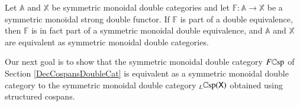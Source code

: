 \documentclass{amsart}
\begin{document}
\begin{prop}
Let $\mathbb{A}$ and $\mathbb{X}$ be symmetric monoidal double categories and let $\mathbb{F} \colon \mathbb{A} \to \mathbb{X}$ be a symmetric monoidal strong double functor. If $\mathbb{F}$ is part of a double equivalence, then $\mathbb{F}$ is in fact part of a symmetric monoidal double equivalence, and $\mathbb{A}$ and $\mathbb{X}$ are equivalent as symmetric monoidal double categories.
\end{prop}

Our next goal is to show that the symmetric monoidal double category $F\mathbb{C}\textnormal{sp}$ of Section \ref{DecCospansDoubleCat} is equivalent as a symmetric monoidal double category to the symmetric monoidal double category $_L \mathbb{C}\textnormal{sp}(\mathsf{X})$ obtained using structured cospans.
\end{document}
